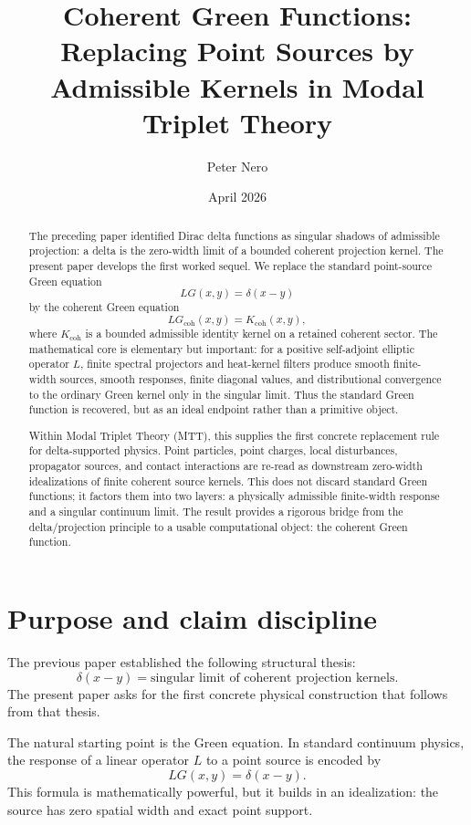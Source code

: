 \documentclass[11pt]{article}
\title{Coherent Green Functions:\\Replacing Point Sources by Admissible Kernels in Modal Triplet Theory}
\author{Peter Nero}
\date{April 2026}
\begin{document}
\maketitle
\seriestagline

\begin{abstract}
The preceding paper identified Dirac delta functions as singular shadows of admissible projection: a delta is the zero-width limit of a bounded coherent projection kernel. The present paper develops the first worked sequel. We replace the standard point-source Green equation
\[
LG(x,y)=\delta(x-y)
\]
by the coherent Green equation
\[
LG_{\mathrm{coh}}(x,y)=K_{\mathrm{coh}}(x,y),
\]
where \(K_{\mathrm{coh}}\) is a bounded admissible identity kernel on a retained coherent sector. The mathematical core is elementary but important: for a positive self-adjoint elliptic operator \(L\), finite spectral projectors and heat-kernel filters produce smooth finite-width sources, smooth responses, finite diagonal values, and distributional convergence to the ordinary Green kernel only in the singular limit. Thus the standard Green function is recovered, but as an ideal endpoint rather than a primitive object.

Within Modal Triplet Theory (MTT), this supplies the first concrete replacement rule for delta-supported physics. Point particles, point charges, local disturbances, propagator sources, and contact interactions are re-read as downstream zero-width idealizations of finite coherent source kernels. This does not discard standard Green functions; it factors them into two layers: a physically admissible finite-width response and a singular continuum limit. The result provides a rigorous bridge from the delta/projection principle to a usable computational object: the coherent Green function.
\end{abstract}

\tableofcontents

\section{Purpose and claim discipline}

The previous paper established the following structural thesis:
\[
\delta(x-y)=\text{singular limit of coherent projection kernels}.
\]
The present paper asks for the first concrete physical construction that follows from that thesis.

The natural starting point is the Green equation. In standard continuum physics, the response of a linear operator \(L\) to a point source is encoded by
\begin{equation}
LG(x,y)=\delta(x-y).
\end{equation}
This formula is mathematically powerful, but it builds in an idealization: the source has zero spatial width and exact point support.
\end{document}
